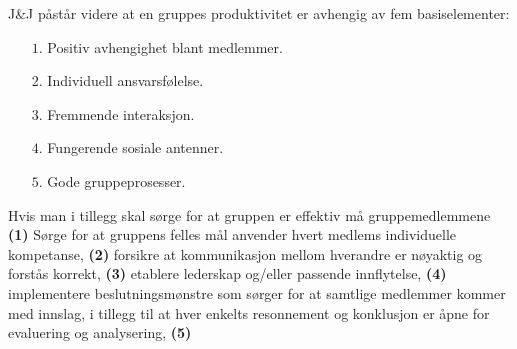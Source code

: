 J\&J påstår videre at en gruppes produktivitet er avhengig av fem
basiselementer:
\begin{itemize}
\item[$1.$] Positiv avhengighet blant medlemmer.
\item[$2.$] Individuell ansvarsfølelse.
\item[$3.$] Fremmende interaksjon.
\item[$4.$] Fungerende sosiale antenner.
\item[$5.$] Gode gruppeprosesser.
\end{itemize}
Hvis man i tillegg skal sørge for at gruppen er effektiv må gruppemedlemmene
\textbf{(1)} Sørge for at gruppens felles mål anvender hvert medlems
individuelle kompetanse, \textbf{(2)} forsikre at kommunikasjon mellom hverandre
er nøyaktig og forstås korrekt, \textbf{(3)} etablere lederskap og/eller
passende innflytelse, \textbf{(4)} implementere beslutningsmønstre som sørger
for at samtlige medlemmer kommer med innslag, i tillegg til at hver enkelts
resonnement og konklusjon er åpne for evaluering og analysering, \textbf{(5)} 

